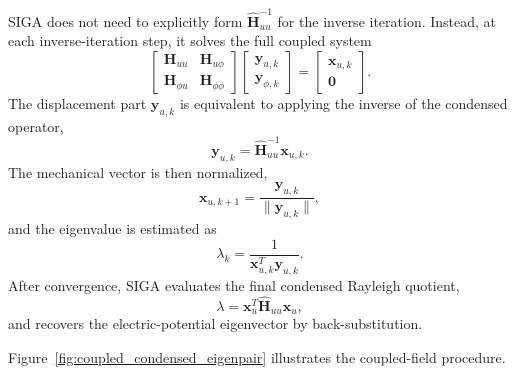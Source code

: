 \documentclass[11pt]{article}
\begin{document}
SIGA does not need to explicitly form \(\widehat{\mathbf{H}}_{uu}^{-1}\) for the inverse iteration. Instead, at each inverse-iteration step, it solves the full coupled system
\[
    \begin{bmatrix}
    \mathbf{H}_{uu} & \mathbf{H}_{u\phi} \\
    \mathbf{H}_{\phi u} & \mathbf{H}_{\phi\phi}
    \end{bmatrix}
    \begin{bmatrix}
    \boldsymbol{y}_{u,k} \\
    \boldsymbol{y}_{\phi,k}
    \end{bmatrix}
    =
    \begin{bmatrix}
    \boldsymbol{x}_{u,k} \\
    \mathbf{0}
    \end{bmatrix}.
\]
The displacement part \(\boldsymbol{y}_{u,k}\) is equivalent to applying the inverse of the condensed operator,
\[
    \boldsymbol{y}_{u,k}
    =
    \widehat{\mathbf{H}}_{uu}^{-1}
    \boldsymbol{x}_{u,k}.
\]
The mechanical vector is then normalized,
\[
    \boldsymbol{x}_{u,k+1}
    =
    \frac{\boldsymbol{y}_{u,k}}{\|\boldsymbol{y}_{u,k}\|},
\]
and the eigenvalue is estimated as
\[
    \lambda_k
    =
    \frac{1}{\boldsymbol{x}_{u,k}^{T}\boldsymbol{y}_{u,k}}.
\]
After convergence, SIGA evaluates the final condensed Rayleigh quotient,
\[
    \lambda
    =
    \boldsymbol{x}_{u}^{T}
    \widehat{\mathbf{H}}_{uu}
    \boldsymbol{x}_{u},
\]
and recovers the electric-potential eigenvector by back-substitution.

Figure~\ref{fig:coupled_condensed_eigenpair} illustrates the coupled-field procedure.
\end{document}
